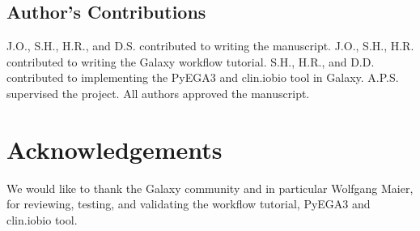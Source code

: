 \subsection*{Author's Contributions}
J.O., S.H., H.R., and D.S. contributed to writing the manuscript. J.O., S.H., H.R. contributed to writing the Galaxy workflow tutorial. S.H., H.R., and D.D. contributed to implementing the PyEGA3 and clin.iobio tool in Galaxy. A.P.S. supervised the project. All authors approved the manuscript.

\section*{Acknowledgements}
We would like to thank the Galaxy community and in particular Wolfgang Maier, for reviewing, testing, and validating the workflow tutorial, PyEGA3 and clin.iobio tool.

\footnotesize


\normalsize
